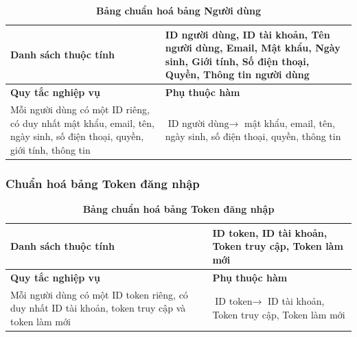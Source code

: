 \begin{table}[H]
  \caption{\bfseries \fontsize{12pt}{0pt}\selectfont Bảng chuẩn hoá bảng Người dùng}
  \centering
  \begin{tabularx}{0.9\textwidth}{|X|X|}
    \hline
    \textbf{Danh sách thuộc tính} & ID người dùng, ID tài khoản, Tên người dùng, Email, Mật khẩu, Ngày sinh, Giới tính, Số điện thoại, Quyền, Thông tin người dùng \\
    \hline
    \textbf{Quy tắc nghiệp vụ} & \textbf{Phụ thuộc hàm} \\
    \hline
    Mỗi người dùng có một ID riêng, có duy nhất mật khẩu, email, tên, ngày sinh, số điện thoại, quyền,
    giới tính, thông tin & \parbox[t]{\linewidth}{$\text{ID người dùng} \rightarrow$ mật khẩu, email, tên, ngày sinh, số điện thoại, quyền, thông tin} \\
    \hline
     \\
     \\
    \hline
  \end{tabularx}
\end{table}

\subsubsection{Chuẩn hoá bảng Token đăng nhập}
\mbox{}

\begin{table}[H]
  \caption{\bfseries \fontsize{12pt}{0pt}\selectfont Bảng chuẩn hoá bảng Token đăng nhập}
  \centering
  \begin{tabularx}{0.9\textwidth}{|X|X|}
    \hline
    \textbf{Danh sách thuộc tính} & ID token, ID tài khoản, Token truy cập, Token làm mới \\
    \hline
    \textbf{Quy tắc nghiệp vụ} & \textbf{Phụ thuộc hàm} \\
    \hline
    Mỗi người dùng có một ID token riêng, có duy nhất ID tài khoản, token truy cập và token làm mới 
    & \parbox[t]{\linewidth}{$\text{ID token} \rightarrow$ ID tài khoản, Token truy cập, Token làm mới} \\
    \hline
     \\
     \\
    \hline
  \end{tabularx}
\end{table}

